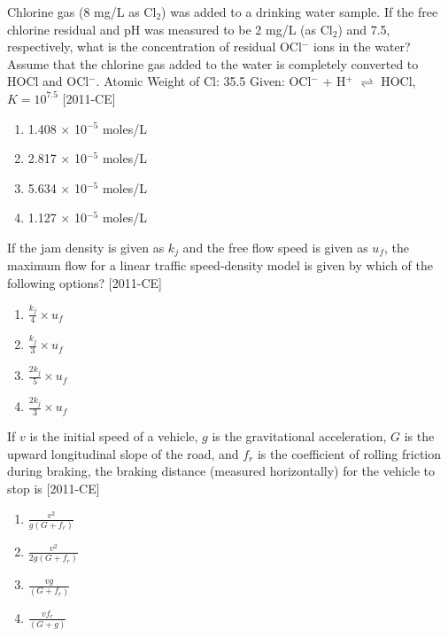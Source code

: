     \item Chlorine gas (8 mg/L as Cl$_2$) was added to a drinking water sample. If the free chlorine residual and pH was measured to be 2 mg/L (as Cl$_2$) and 7.5, respectively, what is the concentration of residual OCl$^-$ ions in the water? Assume that the chlorine gas added to the water is completely converted to HOCl and OCl$^-$. Atomic Weight of Cl: 35.5 
    Given: OCl$^-$ + H$^+$ $\rightleftharpoons$ HOCl,   $K = 10^{7.5}$ \hfill{[2011-CE]}
    \begin{enumerate}
        \item 1.408 $\times$ 10$^{-5}$ moles/L
        \item 2.817 $\times$ 10$^{-5}$ moles/L
        \item 5.634 $\times$ 10$^{-5}$ moles/L
        \item 1.127 $\times$ 10$^{-5}$ moles/L
    \end{enumerate}

    \item If the jam density is given as $k_j$ and the free flow speed is given as $u_f$, the maximum flow for a linear traffic speed-density model is given by which of the following options? \hfill{[2011-CE]}
    \begin{enumerate}
        \item $\frac{k_j}{4} \times u_f$
        \item $\frac{k_j}{3} \times u_f$
        \item $\frac{2k_j}{5} \times u_f$
        \item $\frac{2k_j}{3} \times u_f$
    \end{enumerate}

    \item If $v$ is the initial speed of a vehicle, $g$ is the gravitational acceleration, $G$ is the upward longitudinal slope of the road, and $f_r$ is the coefficient of rolling friction during braking, the braking distance (measured horizontally) for the vehicle to stop is \hfill{[2011-CE]}

    \begin{enumerate}
        \item $\frac{v^2}{g(G + f_r)}$
        \item $\frac{v^2}{2g(G + f_r)}$
        \item $\frac{vg}{(G + f_r)}$
        \item $\frac{vf_r}{(G + g)}$
    \end{enumerate}

